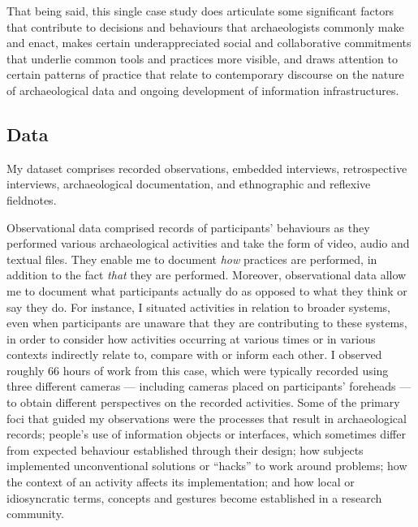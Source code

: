 \documentclass{article}
\begin{document}
That being said, this single case study does articulate some significant
factors that contribute to decisions and behaviours that archaeologists
commonly make and enact, makes certain underappreciated social and
collaborative commitments that underlie common tools and practices more
visible, and draws attention to certain patterns of practice that relate
to contemporary discourse on the nature of archaeological data and
ongoing development of information infrastructures.

\subsection{Data}

My dataset comprises recorded observations, embedded interviews,
retrospective interviews, archaeological documentation, and ethnographic
and reflexive fieldnotes.

Observational data comprised records of participants' behaviours as they
performed various archaeological activities and take the form of video,
audio and textual files. They enable me to document \emph{how} practices
are performed, in addition to the fact \emph{that} they are performed.
Moreover, observational data allow me to document what participants
actually do as opposed to what they think or say they do. For instance,
I situated activities in relation to broader systems, even when
participants are unaware that they are contributing to these systems, in
order to consider how activities occurring at various times or in
various contexts indirectly relate to, compare with or inform each
other. I observed roughly 66 hours of work from this case, which were
typically recorded using three different cameras --- including cameras
placed on participants' foreheads --- to obtain different perspectives
on the recorded activities. Some of the primary foci that guided my
observations were the processes that result in archaeological records;
people's use of information objects or interfaces, which sometimes
differ from expected behaviour established through their design; how
subjects implemented unconventional solutions or ``hacks'' to work
around problems; how the context of an activity affects its
implementation; and how local or idiosyncratic terms, concepts and
gestures become established in a research community.
\end{document}
